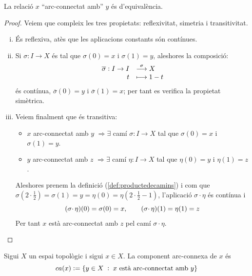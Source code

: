 \documentclass[../main.tex]{subfiles}
\begin{document}
\begin{prop}
\label{prop:larelaciodarcconnexioesdequivalencia} La relació $x$ ``arc-connectat amb'' $y$ és d'equivalència.
\end{prop}
\begin{proof}
Veiem que compleix les tres propietats: reflexivitat, simetria i transitivitat.
\begin{enumerate}[(i)]
    \item És reflexiva, atès que les aplicacions constants són contínues.
    \item Si $\sigma:I\rightarrow X$ és tal que $\sigma(0) = x$ i $\sigma(1) = y$, aleshores la composició:
    \begin{equation}
        \notag
        \begin{array}{rl}
            \overline{\sigma}:I\rightarrow I & \overset{\sigma}{\longrightarrow} X \\
            t & \longmapsto 1-t
        \end{array}
    \end{equation}
    és contínua, $\overline{\sigma}(0)=y$ i $\overline{\sigma}(1) = x$; per tant es verifica la propietat simètrica.
    \item Veiem finalment que és transitiva:
    \begin{itemize}
        \item $x$ arc-connectat amb $y$ $\Rightarrow \exists$ camí $\sigma:I\rightarrow X$ tal que $\sigma(0) = x$ i $\sigma(1) = y$.
        \item $y$ arc-connectat amb $z$ $\Rightarrow \exists$ camí $\eta:I\rightarrow X$ tal que $\eta(0) = y$ i $\eta(1) = z$.
    \end{itemize}
    
    Aleshores prenem la definició (\ref{def:productedecamins}) i com que $\sigma(2\cdotp\frac{1}{2}) = \sigma(1) = y = \eta(0) = \eta(2\cdotp\frac{1}{2}-1)$, l'aplicació $\sigma\cdotp\eta$ és contínua i
    \begin{equation}
        \notag
        (\sigma\cdotp\eta)(0) = \sigma(0) = x,\qquad (\sigma\cdotp\eta)(1) = \eta(1)=z
    \end{equation}
    Per tant $x$ està arc-connectat amb $z$ pel camí $\sigma\cdotp\eta$.
\end{enumerate}
\end{proof}

\begin{defi}
 Sigui $X$ un espai topològic i sigui $x\in X$. La component arc-connexa de $x$ és
\begin{equation}
    \notag
    ca(x):=\{y\in X\;:\;\text{$x$ està arc-connectat amb $y$}\}
\end{equation}
\end{defi}
\end{document}
